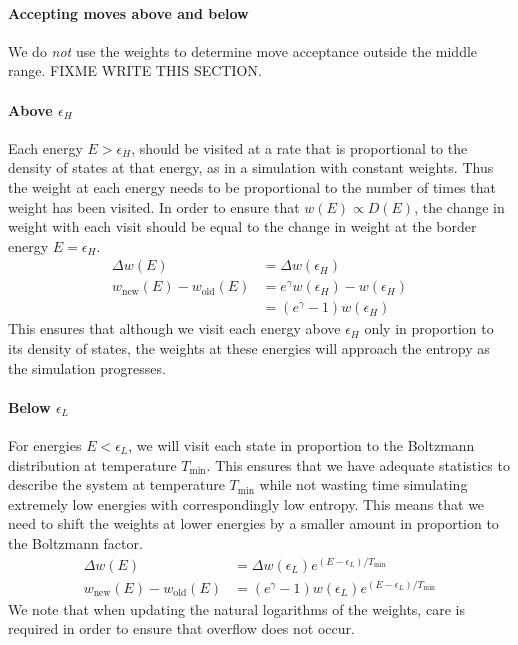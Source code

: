 \documentclass[letterpaper,twocolumn,amsmath,amssymb,pre,aps,10pt]{revtex4-1}
\begin{document}
\paragraph{Accepting moves above and below}
We do \emph{not} use the weights to determine move acceptance outside
the middle range.  FIXME WRITE THIS SECTION.

\paragraph{Above $\epsilon_H$}
Each energy $E>\epsilon_H$, should be visited at a rate that
is proportional to the density of states at that energy, as in a
simulation with constant weights.  Thus the weight at each energy
needs to be proportional to the number of times that weight has been
visited.  In order to ensure that $w(E) \propto D(E)$, the change in
weight with each visit should be equal to the change in weight at
the border energy $E=\epsilon_H$.
\begin{align}
  \Delta w(E) &= \Delta w(\epsilon_H) \\
  w_{\text{new}}(E)-w_{\text{old}}(E)
    &= e^\gamma w(\epsilon_H) - w(\epsilon_H) \\
    &= (e^\gamma-1) w(\epsilon_H)
\end{align}
This ensures that although we visit each energy above $\epsilon_H$ only
in proportion to its density of states, the weights at these energies
will approach the entropy as the simulation progresses.

\paragraph{Below $\epsilon_L$}
For energies $E<\epsilon_L$, we will visit each state in proportion to
the Boltzmann distribution at temperature $T_{\min}$.  This ensures that
we have adequate statistics to describe the system at temperature
$T_{\min}$ while not wasting time simulating extremely low energies with
correspondingly low entropy.  This means that we need to shift the
weights at lower energies by a smaller amount in proportion to the
Boltzmann factor.
\begin{align}
  \Delta w(E) &= \Delta w(\epsilon_L)e^{(E-\epsilon_L)/T_{\min}} \\
  w_{\text{new}}(E)-w_{\text{old}}(E)
    &= (e^\gamma-1) w(\epsilon_L)e^{(E-\epsilon_L)/T_{\min}}
\end{align}
We note that when updating the natural logarithms of the weights, care
is required in order to ensure that overflow does not occur.
\end{document}
